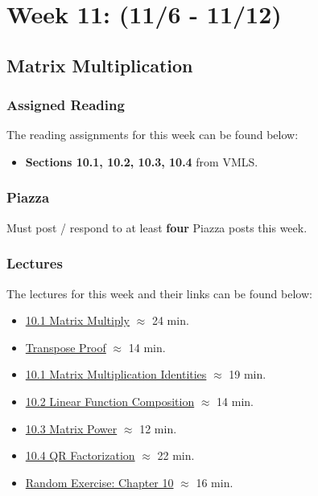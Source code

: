 \clearpage
\chapter{Week 11: (11/6 - 11/12)}

\section{Matrix Multiplication}

\subsection{Assigned Reading}

The reading assignments for this week can be found below:

\begin{itemize}
    \item \textbf{Sections 10.1, 10.2, 10.3, 10.4} from VMLS.
\end{itemize}

\subsection{Piazza}

Must post / respond to at least \textbf{four} Piazza posts this week.  

\subsection{Lectures}

The lectures for this week and their links can be found below:

\begin{itemize}
    \item \href{https://applied.cs.colorado.edu/mod/hvp/view.php?id=50788}{10.1 Matrix Multiply} $\approx$ 24 min.
    \item \href{https://applied.cs.colorado.edu/mod/hvp/view.php?id=50789}{Transpose Proof} $\approx$ 14 min.
    \item \href{https://applied.cs.colorado.edu/mod/hvp/view.php?id=50790}{10.1 Matrix Multiplication Identities} $\approx$ 19 min.
    \item \href{https://applied.cs.colorado.edu/mod/hvp/view.php?id=50791}{10.2 Linear Function Composition} $\approx$ 14 min.
    \item \href{https://applied.cs.colorado.edu/mod/hvp/view.php?id=50792}{10.3 Matrix Power} $\approx$ 12 min.
    \item \href{https://applied.cs.colorado.edu/mod/hvp/view.php?id=50793}{10.4 QR Factorization} $\approx$ 22 min.
    \item \href{https://applied.cs.colorado.edu/mod/hvp/view.php?id=50794}{Random Exercise: Chapter 10} $\approx$ 16 min.
\end{itemize}

